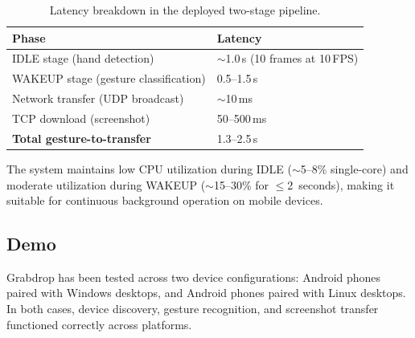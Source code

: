 \begin{table}[ht]
\centering
\caption{Latency breakdown in the deployed two-stage pipeline.}
\label{tab:latency}
\begin{tabular}{@{}ll@{}}
\toprule
\textbf{Phase} & \textbf{Latency} \\
\midrule
IDLE stage (hand detection) & $\sim$1.0\,s (10 frames at 10\,FPS) \\
WAKEUP stage (gesture classification) & 0.5--1.5\,s \\
Network transfer (UDP broadcast) & $\sim$10\,ms \\
TCP download (screenshot) & 50--500\,ms \\
\midrule
\textbf{Total gesture-to-transfer} & 1.3--2.5\,s \\
\bottomrule
\end{tabular}
\end{table}

The system maintains low CPU utilization during IDLE ($\sim$5--8\%
single-core) and moderate utilization during WAKEUP
($\sim$15--30\% for $\leq$2~seconds), making it suitable for
continuous background operation on mobile devices.

\subsection{Demo}

Grabdrop has been tested across two device configurations:
Android phones paired with Windows desktops, and Android phones paired
with Linux desktops. In both cases, device discovery, gesture
recognition, and screenshot transfer functioned correctly across
platforms.
